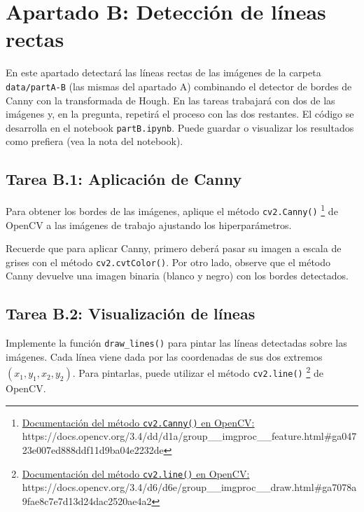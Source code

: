 \chapter{Apartado B: \textbf{Detección de líneas rectas}}
\label{chapter:tarea_b}

En este apartado detectará las líneas rectas de las imágenes de la carpeta \texttt{data/partA-B} (las mismas del apartado A) combinando el detector de bordes de Canny con la transformada de Hough. En las tareas trabajará con dos de las imágenes y, en la pregunta, repetirá el proceso con las dos restantes. El código se desarrolla en el notebook \texttt{partB.ipynb}. Puede guardar o visualizar los resultados como prefiera (vea la nota del notebook).

\section*{Tarea B.1: Aplicación de Canny}
{}

Para obtener los bordes de las imágenes, aplique el método \texttt{cv2.Canny()} \footnote{ \href{https://docs.opencv.org/3.4/dd/d1a/group\_\_imgproc\_\_feature.html\#ga04723e007ed888ddf11d9ba04e2232de}{Documentación del método \texttt{cv2.Canny()} en OpenCV:} \\{https://docs.opencv.org/3.4/dd/d1a/group\_\_imgproc\_\_feature.html\#ga04723e007ed888ddf11d9ba04e2232de}} de OpenCV a las imágenes de trabajo ajustando los hiperparámetros.

Recuerde que para aplicar Canny, primero deberá pasar su imagen a escala de grises con el método \texttt{cv2.cvtColor()}. Por otro lado, observe que el método Canny devuelve una imagen binaria (blanco y negro) con los bordes detectados.

\section*{Tarea B.2: Visualización de líneas}
{}

Implemente la función \texttt{draw\_lines()} para pintar las líneas detectadas sobre las imágenes. Cada línea viene dada por las coordenadas de sus dos extremos $(x_1, y_1, x_2, y_2)$. Para pintarlas, puede utilizar el método \texttt{cv2.line()} \footnote{ \href{https://docs.opencv.org/3.4/d6/d6e/group\_\_imgproc\_\_draw.html\#ga7078a9fae8c7e7d13d24dac2520ae4a2}{Documentación del método \texttt{cv2.line()} en OpenCV:} \\{https://docs.opencv.org/3.4/d6/d6e/group\_\_imgproc\_\_draw.html\#ga7078a9fae8c7e7d13d24dac2520ae4a2}} de OpenCV.

